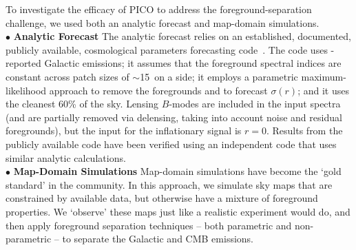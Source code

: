 \documentclass[PICOReport.tex]{subfiles}
\begin{document}
To investigate the efficacy of PICO to address the foreground-separation challenge, we used both an analytic forecast and map-domain simulations. \\ 
%
\noindent$\bullet$ {\bf Analytic Forecast} \hspace{0.1in} The analytic forecast relies on an established, documented, publicly available, cosmological parameters forecasting code~\citep{errard_and_finney}. The code uses \planck -reported Galactic emissions; it assumes that the foreground spectral indices are constant across patch sizes of $\sim$15\degree\ on a side; it employs a parametric maximum-likelihood approach to remove the foregrounds and to forecast $\sigma(r)$; and it uses the cleanest 60\% of the sky. Lensing $B$-modes are included in the input spectra (and are partially removed via delensing, taking into account noise and residual foregrounds), but the input for the inflationary signal is $r=0$.  Results from the publicly available code have been verified using an independent code that uses similar analytic calculations.  \\
%
%
\noindent$\bullet$ {\bf Map-Domain Simulations} \hspace{0.1in} Map-domain simulations have become the `gold standard' in the community. In this approach, we simulate sky maps that are constrained by available data, but otherwise have a mixture of foreground properties. We `observe' these maps just like a realistic experiment would do, and then apply foreground separation techniques -- both parametric and non-parametric -- to separate the Galactic and CMB emissions. 
\end{document}
